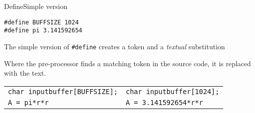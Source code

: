 \documentclass[xcolor=svgnames]{beamer}
\begin{document}
\begin{frame}[fragile]{Define}{Simple version}
\begin{tcolorbox}
\begin{verbatim}
#define BUFFSIZE 1024
#define pi 3.141592654
\end{verbatim}
\end{tcolorbox}

The simple version of \texttt{#define} creates a token and a \alert{\emph{textual}} substitution

Where the pre-processor finds a matching token in the source code, it is replaced with the text.

\begin{tabular}{l@{$\rightarrow$}l}
\texttt{char inputbuffer[BUFFSIZE];}%
&
\texttt{char inputbuffer[1024];}
\\
\texttt{A = pi*r*r} & \texttt{A = 3.141592654*r*r}\\
\end{tabular}

\end{frame}
\end{document}
